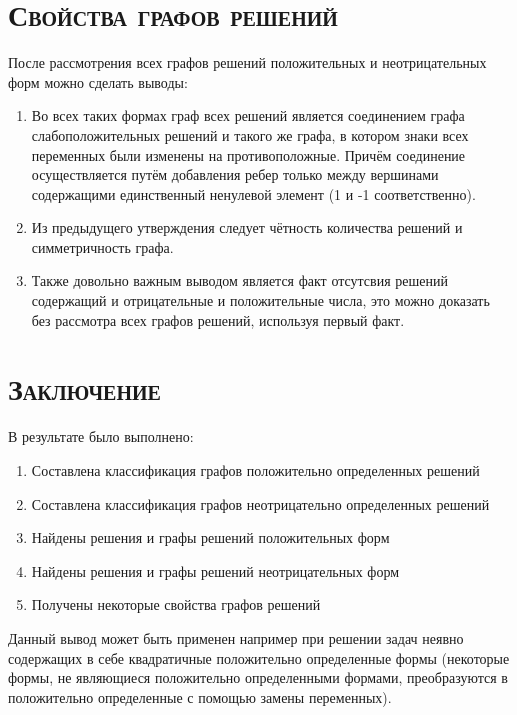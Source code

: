\documentclass[12pt, a4paper]{article}
\begin{document}
{    \pagebreak      
    \section{\textsc{Свойства графов решений}}
        После рассмотрения всех графов решений положительных и неотрицательных форм можно сделать выводы:\\
        \begin{enumerate}
        \item Во всех таких формах граф всех решений является соединением графа слабоположительных решений и такого же графа, в котором знаки всех переменных были изменены на противоположные. Причём соединение осуществляется путём добавления ребер только между вершинами содержащими единственный ненулевой элемент (1 и -1 соответственно).
        \item Из предыдущего утверждения следует чётность количества решений и симметричность графа.
        \item Также довольно важным выводом является факт отсутсвия решений содержащий и отрицательные и положительные числа, это можно доказать без рассмотра всех графов решений, используя первый факт.
        \end{enumerate}
    \pagebreak

    \section{\textsc{Заключение}}
         В результате было выполнено:
         \begin{enumerate}
             \item Составлена классификация графов положительно определенных решений
             \item Составлена классификация графов неотрицательно определенных решений
             \item Найдены решения и графы решений положительных форм
             \item Найдены решения и графы решений неотрицательных форм
             \item Получены некоторые свойства графов решений
         \end{enumerate}
         Данный вывод может быть применен например при решении задач неявно содержащих в себе квадратичные положительно определенные формы (некоторые формы, не являющиеся положительно определенными формами, преобразуются в положительно определенные с помощью замены переменных).
    \pagebreak

}
\end{document}
